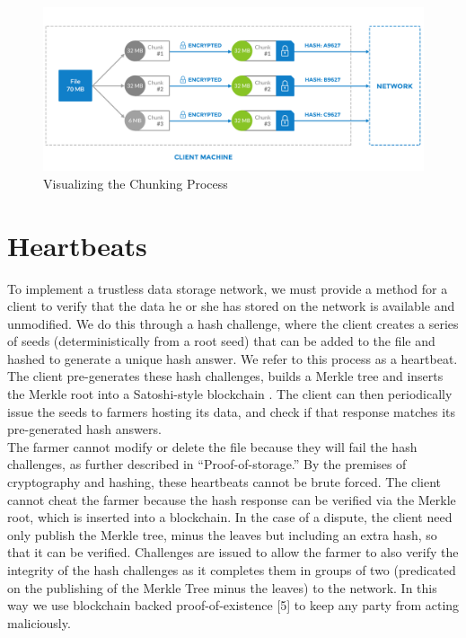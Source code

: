 \documentclass[a4paper,10pt]{article}
\begin{document}
\begin{figure}[h]
\centering
\includegraphics[width=\linewidth]{1}
\caption{Visualizing the Chunking Process}
\end{figure}

\section{Heartbeats}
To implement a trustless data storage network, we must provide a method for a client to verify that the data he or she has stored on the network is available and unmodified. We do this through a hash challenge, where the client creates a series of seeds (deterministically from a root seed) that can be added to the file and hashed to generate a unique hash answer. We refer to this process as a heartbeat. The client pre-generates these hash challenges, builds a Merkle tree \cite{2} and inserts the Merkle root into a Satoshi-style blockchain \cite{3}. The client can then periodically issue the seeds to farmers hosting its data, and check if that response matches its pre-generated hash answers.\\

The farmer cannot modify or delete the file because they will fail the hash challenges, as further described in “Proof-of-storage.”  By the premises of cryptography and hashing, these heartbeats cannot be brute forced. The client cannot cheat the farmer because the hash response can be verified via the Merkle root, which is inserted into a blockchain. In the case of a dispute, the client need only publish the Merkle tree, minus the leaves but including an extra hash, so that it can be verified. Challenges are issued to allow the farmer to also verify the integrity of the hash challenges as it completes them in groups of two (predicated on the publishing of the Merkle Tree minus the leaves) to the network. In this way we use blockchain backed proof-of-existence \cite{4} [5] to keep any party from acting maliciously.  \\
\end{document}

